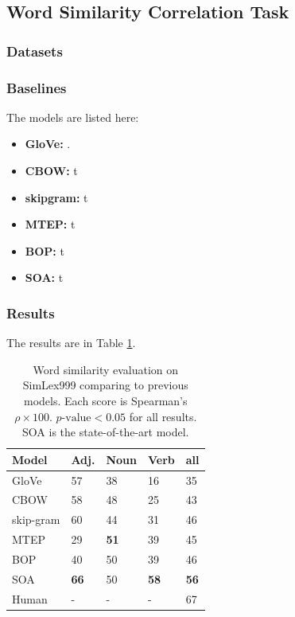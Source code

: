 \documentclass[a4paper]{article}
\begin{document}
\subsection{Word Similarity Correlation Task}  \label{sec:wordsim}
% 
% 
\subsubsection{Datasets} \label{sec:dataset-wordsim}

\subsubsection{Baselines} \label{sec:baselines-wordsim}
The models are listed here: 
\begin{itemize}
  \item \textbf{GloVe: }    \citet{pennington2014glove}.
  \item \textbf{CBOW: }     t
  \item \textbf{skipgram: } t
  \item \textbf{MTEP: }     t
  \item \textbf{BOP: }      t
  \item \textbf{SOA: }      t
\end{itemize}


\subsubsection{Results} \label{sec:result-wordsim}
The results are in Table \ref{tab:wordsim}. 
\begin{table}[t]
\centering
\begin{tabular}{l||l|l|l|l}
\textbf{Model}  &   Adj.&   Noun    &   Verb    &   all \\ \hline
GloVe       &       57  &   38      &   16      &   35  \\
CBOW        &       58  &   48      &   25      &   43  \\
skip-gram   &       60  &   44      &   31      &   46  \\ \hline
MTEP        &       29  & \textbf{51} & 39      &   45  \\
BOP         &       40  &   50      &   39      &   46  \\ \hline
SOA         & \textbf{66} & 50  & \textbf{58} & \textbf{56} \\
Human       &       -   &   -       &   -       &   67  \\
\end{tabular}
\caption{\label{tab:wordsim} Word similarity evaluation on SimLex999 comparing to previous models. Each score is Spearman's $\rho \times 100$. $p\text{-value} < 0.05$ for all results. SOA is the state-of-the-art model. }
\end{table}
\end{document}
